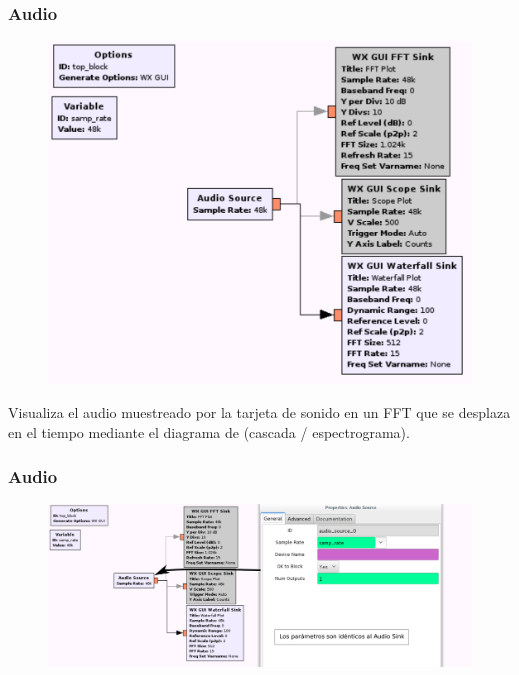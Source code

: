 \begin{frame}[fragile]
\frametitle{Audio}
\justifying

\begin{figure}

\begin{center}
\includegraphics[scale=0.3]{lab3/pdf/lab34.pdf}

\end{center}

\end{figure}

\justifying
Visualiza el audio muestreado por la tarjeta de sonido en un FFT
que se desplaza en el tiempo mediante el diagrama de (cascada /
espectrograma).

\end{frame}

\begin{frame}[fragile]
\frametitle{Audio}
\justifying

\begin{figure}

\begin{center}
\includegraphics[width=\paperwidth,height=0.55\paperheight]{lab3/pdf/lab35.pdf}
\end{center}

\end{figure}

\end{frame}

